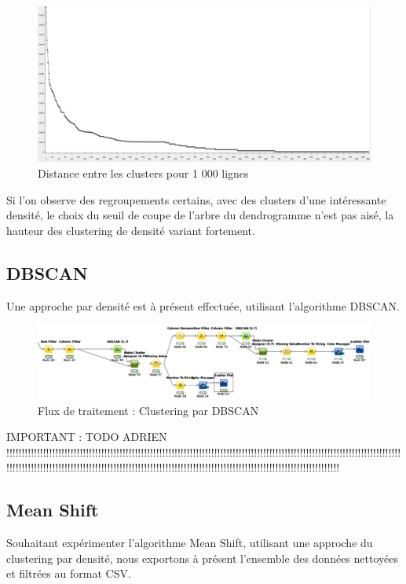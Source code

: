 \begin{figure}[h!]
    \centering
    \includegraphics[width=\linewidth]{img/1000_histo2.png}
    \caption{Distance entre les clusters pour 1 000 lignes}
\end{figure}

Si l'on observe des regroupements certains, avec des clusters d'une intéressante densité, le choix du seuil de coupe de l'arbre du dendrogramme n'est pas aisé, la hauteur des clustering de densité variant fortement.
\pagebreak



\subsection{DBSCAN}
Une approche par densité est à présent effectuée, utilisant l'algorithme DBSCAN.

\begin{figure}[h!]
    \centering
    \includegraphics[width=\linewidth]{img/knime_dbscan.png}
    \caption{Flux de traitement : Clustering par DBSCAN}
\end{figure}

IMPORTANT : TODO ADRIEN !!!!!!!!!!!!!!!!!!!!!!!!!!!!!!!!!!!!!!!!!!!!!!!!!!!!!!!!!!!!!!!!!!!!!!!!!!!!!!!!!!!!!!!!!!!!!!!!!!!!!!!!!!!!!!!!!!!!!!!!!!!!!!!!!!!!!!!!!!!!!!!!!!!!!!!!!!!!!!!!!!!!!!!!!!!!!!!!!!!!!!!!!!!!!!!!!!!!!!!!!!!!!!!!!!!!!!!!!!!!!!!!!!!!!!!!!!!!!!
\pagebreak




\subsection{Mean Shift}
Souhaitant expérimenter l'algorithme Mean Shift, utilisant une approche du clustering par densité, nous exportons à présent l'ensemble des données nettoyées et filtrées au format CSV.

